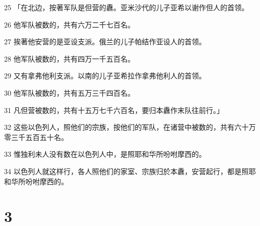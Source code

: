 \par 25 「在北边，按著军队是但营的纛。亚米沙代的儿子亚希以谢作但人的首领。
\par 26 他军队被数的，共有六万二千七百名。
\par 27 挨著他安营的是亚设支派。俄兰的儿子帕结作亚设人的首领。
\par 28 他军队被数的，共有四万一千五百名。
\par 29 又有拿弗他利支派。以南的儿子亚希拉作拿弗他利人的首领。
\par 30 他军队被数的，共有五万三千四百名。
\par 31 凡但营被数的，共有十五万七千六百名，要归本纛作末队往前行。」
\par 32 这些以色列人，照他们的宗族，按他们的军队，在诸营中被数的，共有六十万零三千五百五十名。
\par 33 惟独利未人没有数在以色列人中，是照耶和华所吩咐摩西的。
\par 34 以色列人就这样行，各人照他们的家室、宗族归於本纛，安营起行，都是照耶和华所吩咐摩西的。

\chapter{3}

